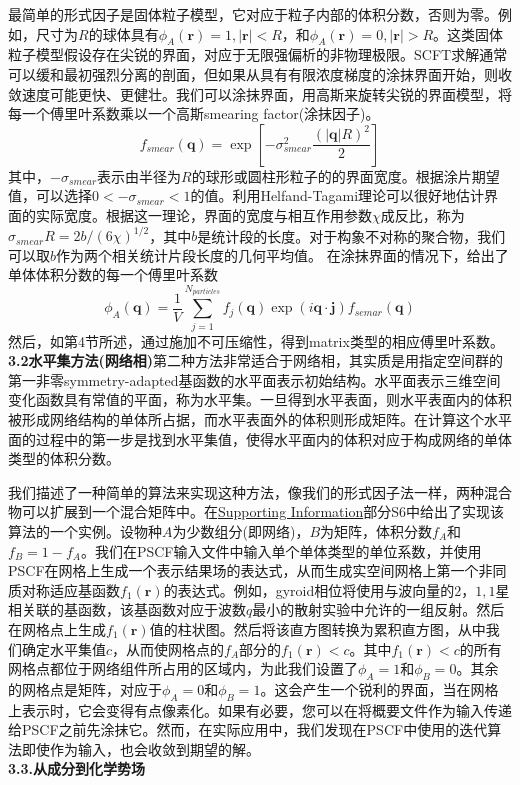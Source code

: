 \documentclass[12pt,a4paper]{article}
\begin{document}
最简单的形式因子是固体粒子模型，它对应于粒子内部的体积分数，否则为零。例如，尺寸为$R$的球体具有$\phi _{A}(\mathbf{r})=1,|\mathbf{r}|<R$，和$\phi _{A}(\mathbf{r})=0,|\mathbf{r}|>R$。这类固体粒子模型假设存在尖锐的界面，对应于无限强偏析的非物理极限。SCFT求解通常可以缓和最初强烈分离的剖面，但如果从具有有限浓度梯度的涂抹界面开始，则收敛速度可能更快、更健壮。我们可以涂抹界面，用高斯来旋转尖锐的界面模型，将每一个傅里叶系数乘以一个高斯smearing factor(涂抹因子)。
\begin{equation}\label{14}
f_{smear}(\mathbf{q})=\exp \left[ -\sigma _{smear}^2 \frac{(|\mathbf{q}|R)^2}{2} \right]
\end{equation}
其中，$-\sigma _{smear}$表示由半径为$R$的球形或圆柱形粒子的的界面宽度。根据涂片期望值，可以选择$0<-\sigma _{smear}<1$的值。利用Helfand-Tagami理论可以很好地估计界面的实际宽度。根据这一理论，界面的宽度与相互作用参数$\chi$成反比，称为$\sigma _{smear} R=2b/(6 \chi)^{1/2}$，其中$b$是统计段的长度。对于构象不对称的聚合物，我们可以取$b$作为两个相关统计片段长度的几何平均值。
在涂抹界面的情况下，给出了单体体积分数的每一个傅里叶系数
\begin{equation}\label{15}
\phi _A(\mathbf{q})=\frac{1}{V}\sum _{j=1}^{N_{particles}} f_j(\mathbf{q})\exp (i \mathbf{q \cdot \mathbf{j}}) f_{semar}(\mathbf{q})
\end{equation}
然后，如第4节所述，通过施加不可压缩性，得到matrix类型的相应傅里叶系数。\\
\textbf{3.2水平集方法(网络相)}第二种方法非常适合于网络相，其实质是用指定空间群的第一非零symmetry-adapted基函数的水平面表示初始结构。水平面表示三维空间变化函数具有常值的平面，称为水平集。一旦得到水平表面，则水平表面内的体积被形成网络结构的单体所占据，而水平表面外的体积则形成矩阵。在计算这个水平面的过程中的第一步是找到水平集值，使得水平面内的体积对应于构成网络的单体类型的体积分数。

我们描述了一种简单的算法来实现这种方法，像我们的形式因子法一样，两种混合物可以扩展到一个混合矩阵中。在\href{http://pubs.acs.org/doi/suppl/10.1021/acs.macromol.6b00107/suppl_file/ma6b00107_si_001.pdf}{Supporting Information}部分S6中给出了实现该算法的一个实例。设物种$A$为少数组分(即网络)，$B$为矩阵，体积分数$f_A$和$f_B=1-f_A$。我们在PSCF输入文件中输入单个单体类型的单位系数，并使用PSCF在网格上生成一个表示结果场的表达式，从而生成实空间网格上第一个非同质对称适应基函数$f_1(\mathbf{r})$的表达式。例如，gyroid相位将使用与波向量的${2，1,1}$星相关联的基函数，该基函数对应于波数$q$最小的散射实验中允许的一组反射。然后在网格点上生成$f_1(\mathbf{r})$值的柱状图。然后将该直方图转换为累积直方图，从中我们确定水平集值$c$，从而使网格点的$f_A$部分的$f_1(\mathbf{r})<c$。其中$f_1(\mathbf{r})<c$的所有网格点都位于网络组件所占用的区域内，为此我们设置了$\phi _A=1$和$\phi _B=0$。其余的网格点是矩阵，对应于$\phi _A=0$和$\phi _B=1$。这会产生一个锐利的界面，当在网格上表示时，它会变得有点像素化。如果有必要，您可以在将概要文件作为输入传递给PSCF之前先涂抹它。然而，在实际应用中，我们发现在PSCF中使用的迭代算法即使作为输入，也会收敛到期望的解。\\
\textbf{3.3.从成分到化学势场}
\end{document}
